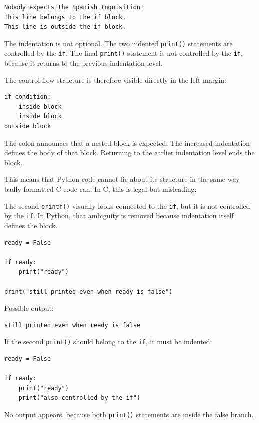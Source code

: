 \begin{verbatim}
Nobody expects the Spanish Inquisition!
This line belongs to the if block.
This line is outside the if block.
\end{verbatim}

The indentation is not optional. The two indented \texttt{print()} statements are controlled by the \texttt{if}. The final \texttt{print()} statement is not controlled by the \texttt{if}, because it returns to the previous indentation level.

The control-flow structure is therefore visible directly in the left margin:

\begin{verbatim}
if condition:
    inside block
    inside block
outside block
\end{verbatim}

The colon announces that a nested block is expected. The increased indentation defines the body of that block. Returning to the earlier indentation level ends the block.

This means that Python code cannot lie about its structure in the same way badly formatted C code can. In C, this is legal but misleading:

The second \texttt{printf()} visually looks connected to the \texttt{if}, but it is not controlled by the \texttt{if}. In Python, that ambiguity is removed because indentation itself defines the block.

\begin{verbatim}
ready = False

if ready:
    print("ready")

print("still printed even when ready is false")
\end{verbatim}

Possible output:

\begin{verbatim}
still printed even when ready is false
\end{verbatim}

If the second \texttt{print()} should belong to the \texttt{if}, it must be indented:

\begin{verbatim}
ready = False

if ready:
    print("ready")
    print("also controlled by the if")
\end{verbatim}

No output appears, because both \texttt{print()} statements are inside the false branch.

